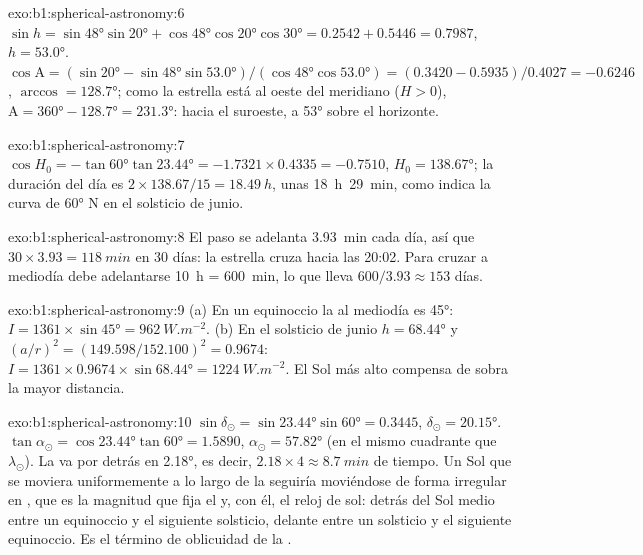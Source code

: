 \begin{solution}{exo:b1:spherical-astronomy:6}
$\sin h = \sin\ang{48}\sin\ang{20} + \cos\ang{48}\cos\ang{20}\cos\ang{30}
= 0.2542 + 0.5446 = 0.7987$, $h = \ang{53.0}$.
$\cos\mathrm{A} = (\sin\ang{20} - \sin\ang{48}\sin\ang{53.0})/(\cos\ang{48}
\cos\ang{53.0}) = (0.3420 - 0.5935)/0.4027 = -0.6246$, $\arccos = \ang{128.7}$;
como la estrella está al oeste del meridiano ($H > 0$), $\mathrm{A} = \ang{360} -
\ang{128.7} = \ang{231.3}$: hacia el suroeste, a \ang{53} sobre el horizonte.
\end{solution}

\begin{solution}{exo:b1:spherical-astronomy:7}
$\cos H_0 = -\tan\ang{60}\tan\ang{23.44} = -1.7321\times0.4335 = -0.7510$,
$H_0 = \ang{138.67}$; la duración del día es $2\times138.67/15 = \qty{18.49}{h}$,
unas \qty{18}{h}~\qty{29}{min}, como indica la curva de \ang{60} N en el solsticio
de junio.
\end{solution}

\begin{solution}{exo:b1:spherical-astronomy:8}
El paso se adelanta \qty{3.93}{min} cada día, así que $30\times3.93 =
\qty{118}{min}$ en 30 días: la estrella cruza hacia las 20:02. Para cruzar a
mediodía debe adelantarse \qty{10}{h} = \qty{600}{min}, lo que lleva
$600/3.93 \approx 153$ días.
\end{solution}

\begin{solution}{exo:b1:spherical-astronomy:9}
(a) En un equinoccio la  al mediodía es \ang{45}: $I = 1361\times\sin\ang{45}
= \qty{962}{W.m^{-2}}$. (b) En el solsticio de junio $h = \ang{68.44}$ y
$(a/r)^2 = (149.598/152.100)^2 = 0.9674$:
$I = 1361\times0.9674\times\sin\ang{68.44} = \qty{1224}{W.m^{-2}}$. El Sol más alto
compensa de sobra la mayor distancia.
\end{solution}

\begin{solution}{exo:b1:spherical-astronomy:10}
$\sin\delta_\odot = \sin\ang{23.44}\sin\ang{60} = 0.3445$,
$\delta_\odot = \ang{20.15}$. $\tan\alpha_\odot = \cos\ang{23.44}\tan\ang{60}
= 1.5890$, $\alpha_\odot = \ang{57.82}$ (en el mismo cuadrante que $\lambda_\odot$).
La  va por detrás en \ang{2.18}, es decir, $2.18\times4 \approx
\qty{8.7}{min}$ de tiempo. Un Sol que se moviera uniformemente a lo largo de la
 seguiría moviéndose de forma irregular en , que es la
magnitud que fija el  y, con él, el reloj de sol: detrás del Sol
medio entre un equinoccio y el siguiente solsticio, delante entre un solsticio y el
siguiente equinoccio. Es el término de oblicuidad de la .
\end{solution}

